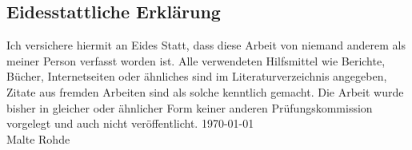 \subsection*{Eidesstattliche Erklärung}

Ich versichere hiermit an Eides Statt, dass diese Arbeit von niemand anderem als
meiner Person verfasst worden ist. Alle verwendeten Hilfsmittel wie Berichte,
Bücher, Internetseiten oder ähnliches sind im Literaturverzeichnis angegeben,
Zitate aus fremden Arbeiten sind als solche kenntlich gemacht. Die Arbeit wurde
bisher in gleicher oder ähnlicher Form keiner anderen Prüfungskommission
vorgelegt und auch nicht veröffentlicht. \parbig
\today{}\\[12ex]
Malte Rohde